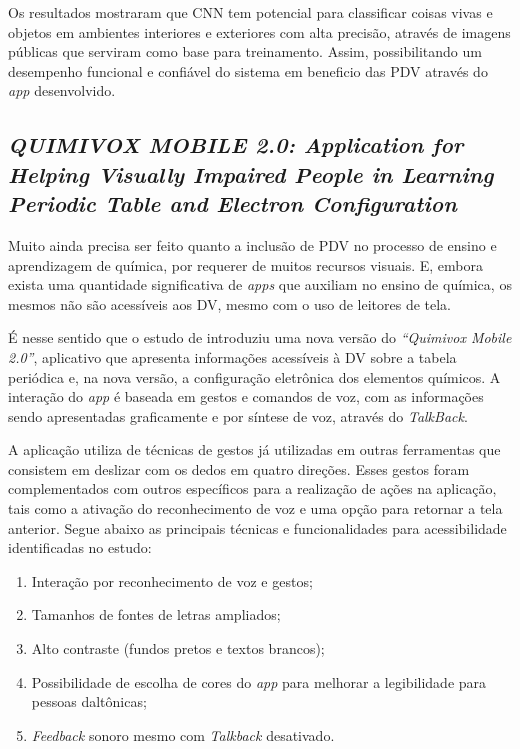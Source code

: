 Os resultados mostraram que CNN tem potencial para classificar coisas vivas e objetos em ambientes interiores e exteriores com alta precisão, através de imagens públicas que serviram como base para treinamento.
Assim, possibilitando um desempenho funcional e confiável do sistema em beneficio das PDV através do \emph{app} desenvolvido.

\subsection{\emph{QUIMIVOX MOBILE 2.0: Application for Helping Visually Impaired People in Learning Periodic Table and Electron Configuration}}

Muito ainda precisa ser feito quanto a inclusão de PDV no processo de ensino e aprendizagem de química, por requerer de muitos recursos visuais.
E, embora exista uma quantidade significativa de \emph{apps} que auxiliam no ensino de química, os mesmos não são acessíveis aos DV, mesmo com o uso de leitores de tela.

É nesse sentido que o estudo de  introduziu uma nova versão do \emph{``Quimivox Mobile 2.0''}, aplicativo que apresenta informações acessíveis à DV sobre a tabela periódica e, na nova versão, a configuração eletrônica dos elementos químicos.
A interação do \emph{app} é baseada em gestos e comandos de voz, com as informações sendo apresentadas graficamente e por síntese de voz, através do \emph{TalkBack}.

A aplicação utiliza de técnicas de gestos já utilizadas em outras ferramentas que consistem em deslizar com os dedos em quatro direções.
Esses gestos foram complementados com outros específicos para a realização de ações na aplicação, tais como a ativação do reconhecimento de voz e uma opção para retornar a tela anterior.
Segue abaixo as principais técnicas e funcionalidades para acessibilidade identificadas no estudo:

\begin{enumerate}
    \item Interação por reconhecimento de voz e gestos;
    \item Tamanhos de fontes de letras ampliados;
    \item Alto contraste (fundos pretos e textos brancos);
    \item Possibilidade de escolha de cores do \emph{app} para melhorar a legibilidade para pessoas daltônicas;
    \item \emph{Feedback} sonoro mesmo com \emph{Talkback} desativado.
\end{enumerate}

